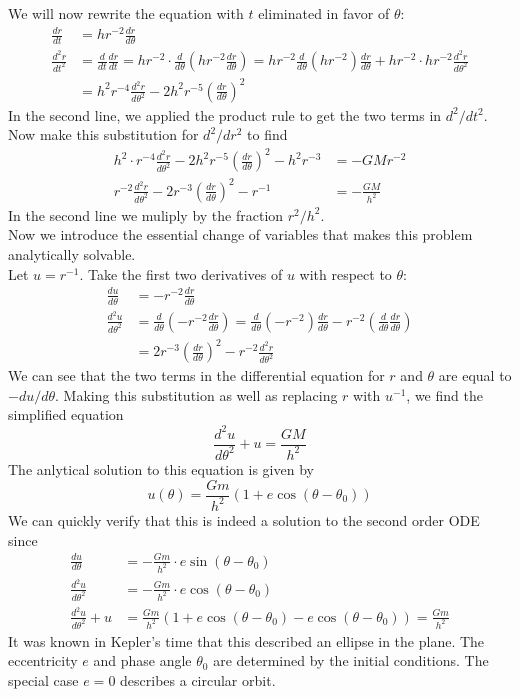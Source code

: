 We will now rewrite the equation with $t$ eliminated in favor of $\theta$:
\begin{align*}
\frac{dr}{dt} &= hr^{-2} \frac{dr}{d\theta} \\
\frac{d^2r}{dt^2} &= \frac{d}{dt} \frac{dr}{dt} = hr^{-2} \cdot \frac{d}{d\theta} \left( hr^{-2} \frac{dr}{d\theta} \right)
= hr^{-2} \frac{d}{d\theta} \left(hr^{-2}\right) \frac{dr}{d\theta}  + hr^{-2} \cdot hr^{-2} \frac{d^2r}{d\theta^2} \\
&= h^2 r^{-4} \frac{d^2r}{d\theta^2} - 2h^2 r^{-5} \left( \frac{dr}{d\theta} \right)^2
\end{align*}
In the second line, we applied the product rule to get the two terms in $d^2 / dt^2$.\\
Now make this substitution for $d^2/ dr^2$ to find
\begin{align*}
h^2 \cdot r^{-4} \frac{d^2r}{d\theta^2} - 2h^2 r^{-5} \left(\frac{dr}{d\theta}\right)^2 - h^2r^{-3} &= -GMr^{-2} \\
r^{-2} \frac{d^2r}{d\theta^2} - 2 r^{-3} \left(\frac{dr}{d\theta}\right)^2 - r^{-1} &= -\frac{GM}{h^2}
\end{align*}
In the second line we muliply by the fraction $r^2 / h^2$.\\
Now we introduce the essential change of variables that makes this problem analytically solvable.\\
Let $u = r^{-1}$.  Take the first two derivatives of $u$ with respect to $\theta$:
\begin{align*}
\frac{du}{d\theta} &= -r^{-2} \frac{dr}{d\theta} \\
\frac{d^2u}{d\theta^2} &= \frac{d}{d\theta} \left( -r^{-2} \frac{dr}{d\theta} \right) = 
\frac{d}{d\theta} \left( -r^{-2} \right)\frac{dr}{d\theta} -r^{-2} \left( \frac{d}{d\theta}   \frac{dr}{d\theta} \right) \\
&= 2r^{-3} \left(\frac{dr}{d\theta}\right)^{2} - r^{-2} \frac{d^2r}{d\theta^2}
\end{align*}
We can see that the two terms in the differential equation for $r$ and $\theta$ are equal to $-du / d\theta$.
Making this substitution as well as replacing $r$ with $u^{-1}$, we find the simplified equation
$$ \frac{d^2u}{d\theta^2} + u = \frac{GM}{h^2}$$
The anlytical solution to this equation is given by
$$u(\theta) = \frac{Gm}{h^2} \left(1 + e \cos(\theta - \theta_0) \right)$$
We can quickly verify that this is indeed a solution to the second order ODE since
\begin{align*}
\frac{du}{d\theta} &= -\frac{Gm}{h^2} \cdot e \sin(\theta - \theta_0) \\
\frac{d^2u}{d\theta^2} &= -\frac{Gm}{h^2} \cdot e \cos(\theta - \theta_0) \\
\frac{d^2u}{d\theta^2} + u &= \frac{Gm}{h^2} \left( 1 + e \cos(\theta-\theta_0) - e \cos(\theta - \theta_0) \right) = \frac{Gm}{h^2}
\end{align*}
It was known in Kepler's time that this described an ellipse in the plane.
The eccentricity $e$ and phase angle $\theta_0$ are determined by the initial conditions.
The special case $e=0$ describes a circular orbit.

